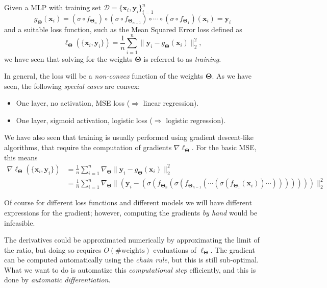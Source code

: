 
Given a MLP with training set $\mathcal{D} = \{ \mathbf{x}_i, \mathbf{y}_i \}_{i=1}^{n}$
\begin{equation} 
    g_{\bm{\Theta}}(\mathbf{x}_i)= (\sigma \circ f_{\bm{\Theta}_n})  \circ (\sigma \circ f_{\bm{\Theta}_{n-1}}) \circ \cdots \circ (\sigma \circ  f_{\bm{\Theta}_1})(\mathbf{x}_i) = \mathbf{y}_i  
\end{equation}
and a suitable loss function, such as the Mean Squared Error loss defined as
\begin{equation} 
	\ell_{\bm{\Theta}} ( \{ \mathbf{x}_i, \mathbf{y}_i\}) = \frac{1}{n}\sum_{i=1}^n \| \mathbf{y}_i - g_{\bm{\Theta}}(\mathbf{x}_i) \|_2^2,
\end{equation}
we have seen that solving for the weights $\bm{\Theta}$ is referred to as \emph{training}.

In general, the loss will be a \emph{non-convex} function of the weights $\bm{\Theta}$. As we have seen, the following \emph{special cases} are convex:
\begin{itemize}
	\item One layer, no activation, MSE loss ($\Rightarrow$ linear regression).
	\item One layer, sigmoid activation, logistic loss ($\Rightarrow$ logistic regression).
\end{itemize}


We have also seen that training is usually performed using gradient descent-like algorithms, that require the computation of gradients $\nabla \ell_{\bm{\Theta}}$. For the basic MSE, this means
\begin{align}
    \nabla \ell_{\bm{\Theta}} ( \{ \mathbf{x}_i, \mathbf{y}_i\}) & =
    \frac{1}{n}  \sum_{i=1}^n \nabla_{\bm{\Theta}} \| \mathbf{y}_i - g_{\bm{\Theta}}(\mathbf{x}_i) \|_2^2  \\
    & = \frac{1}{n}\sum_{i=1}^n \nabla_{\bm{\Theta}} \| (\mathbf{y}_i -  (\sigma ( f_{\bm{\Theta}_n} (\sigma( f_{\bm{\Theta}_{n-1}}( \cdots (\sigma (  f_{\bm{\Theta}_1}(\mathbf{x}_i))\cdots ))))))) \|_2^2 
\end{align}

Of course for different loss functions and different models we will have different expressions for the gradient; however, computing the gradients \emph{by hand} would be infeasible.

The derivatives could be approximated numerically by approximating the limit of the ratio, but doing so requires $O(\#\textrm{weights})$ evaluations of $\ell_{\bm{\Theta}}$. The gradient can be computed automatically using the \emph{chain rule}, but this is still sub-optimal. What we want to do is automatize this \emph{computational step} efficiently, and this is done by \emph{automatic differentiation}.

